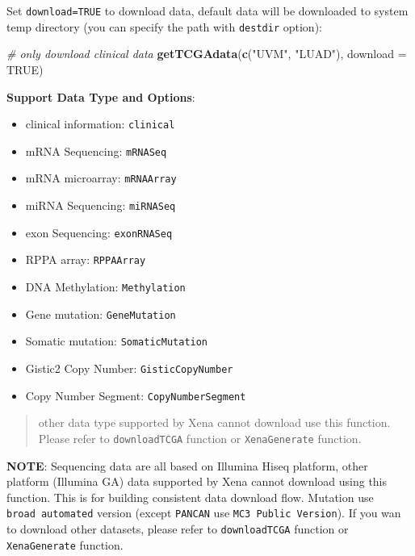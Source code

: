 \documentclass[nofonts,]{tufte-handout}
\newenvironment{Shaded}{\begin{snugshade}}{\end{snugshade}}
\newcommand{\CommentTok}[1]{\textcolor[rgb]{0.56,0.35,0.01}{\textit{#1}}}
\newcommand{\DataTypeTok}[1]{\textcolor[rgb]{0.13,0.29,0.53}{#1}}
\newcommand{\KeywordTok}[1]{\textcolor[rgb]{0.13,0.29,0.53}{\textbf{#1}}}
\newcommand{\NormalTok}[1]{#1}
\newcommand{\OtherTok}[1]{\textcolor[rgb]{0.56,0.35,0.01}{#1}}
\newcommand{\StringTok}[1]{\textcolor[rgb]{0.31,0.60,0.02}{#1}}
\providecommand{\tightlist}{%
  \setlength{\itemsep}{0pt}\setlength{\parskip}{0pt}}
\begin{document}
Set \texttt{download=TRUE} to download data, default data will be
downloaded to system temp directory (you can specify the path with
\texttt{destdir} option):

\begin{Shaded}
\begin{Highlighting}[]
\CommentTok{# only download clinical data}
\KeywordTok{getTCGAdata}\NormalTok{(}\KeywordTok{c}\NormalTok{(}\StringTok{"UVM"}\NormalTok{, }\StringTok{"LUAD"}\NormalTok{), }\DataTypeTok{download =} \OtherTok{TRUE}\NormalTok{)}
\end{Highlighting}
\end{Shaded}

\textbf{Support Data Type and Options}:

\begin{itemize}
\tightlist
\item
  clinical information: \texttt{clinical}
\item
  mRNA Sequencing: \texttt{mRNASeq}
\item
  mRNA microarray: \texttt{mRNAArray}
\item
  miRNA Sequencing: \texttt{miRNASeq}
\item
  exon Sequencing: \texttt{exonRNASeq}
\item
  RPPA array: \texttt{RPPAArray}
\item
  DNA Methylation: \texttt{Methylation}
\item
  Gene mutation: \texttt{GeneMutation}
\item
  Somatic mutation: \texttt{SomaticMutation}
\item
  Gistic2 Copy Number: \texttt{GisticCopyNumber}
\item
  Copy Number Segment: \texttt{CopyNumberSegment}
\end{itemize}

\begin{quote}
other data type supported by Xena cannot download use this function.
Please refer to \texttt{downloadTCGA} function or \texttt{XenaGenerate}
function.
\end{quote}

\textbf{NOTE}: Sequencing data are all based on Illumina Hiseq platform,
other platform (Illumina GA) data supported by Xena cannot download
using this function. This is for building consistent data download flow.
Mutation use \texttt{broad\ automated} version (except \texttt{PANCAN}
use \texttt{MC3\ Public\ Version}). If you wan to download other
datasets, please refer to \texttt{downloadTCGA} function or
\texttt{XenaGenerate} function.
\end{document}
